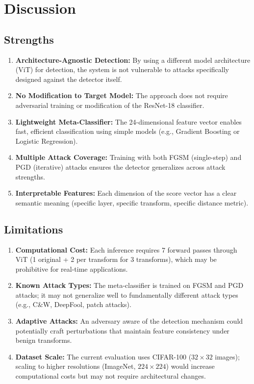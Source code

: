 \documentclass[12pt, a4paper]{article}
\begin{document}
\section{Discussion}

\subsection{Strengths}

\begin{enumerate}
    \item \textbf{Architecture-Agnostic Detection:} By using a different
          model architecture (ViT) for detection, the system is not
          vulnerable to attacks specifically designed against the detector
          itself.
    \item \textbf{No Modification to Target Model:} The approach does not
          require adversarial training or modification of the ResNet-18
          classifier.
    \item \textbf{Lightweight Meta-Classifier:} The 24-dimensional
          feature vector enables fast, efficient classification using
          simple models (e.g., Gradient Boosting or Logistic Regression).
    \item \textbf{Multiple Attack Coverage:} Training with both FGSM
          (single-step) and PGD (iterative) attacks ensures the detector
          generalizes across attack strengths.
    \item \textbf{Interpretable Features:} Each dimension of the score
          vector has a clear semantic meaning (specific layer, specific
          transform, specific distance metric).
\end{enumerate}

\subsection{Limitations}

\begin{enumerate}
    \item \textbf{Computational Cost:} Each inference requires 7 forward
          passes through ViT (1 original + 2 per transform for 3
          transforms), which may be prohibitive for real-time
          applications.
    \item \textbf{Known Attack Types:} The meta-classifier is trained on
          FGSM and PGD attacks; it may not generalize well to
          fundamentally different attack types (e.g., C\&W, DeepFool,
          patch attacks).
    \item \textbf{Adaptive Attacks:} An adversary aware of the detection
          mechanism could potentially craft perturbations that maintain
          feature consistency under benign transforms.
    \item \textbf{Dataset Scale:} The current evaluation uses CIFAR-100
          ($32 \times 32$ images); scaling to higher resolutions
          (ImageNet, $224 \times 224$) would increase computational costs
          but may not require architectural changes.
\end{enumerate}
\end{document}
